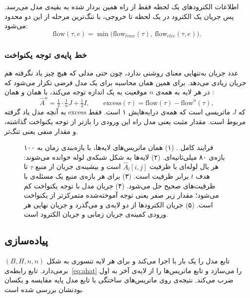 اطلاعات الکترودهای یک لحظه فقط از راه همین بردار ‌شده به بقیه‌ی مدل می‌رسد. پس جریان یک الکترود در یک لحظه تا خروجی، با تنگ‌ترین مرحله از این دو محدود می‌شود:
\begin{equation}
\mathrm{flow}(\tau,e)=\min\big(\mathrm{flow}_{time}(\tau),\ \mathrm{flow}_{elec}(\tau,e)\big).
\end{equation}

\subsubsection*{خط پایه‌ی توجه یکنواخت}
عدد جریان به‌تنهایی معنای روشنی ندارد، چون حتی مدلی که هیچ چیز یاد نگرفته هم جریان زیادی می‌دهد. برای همین همان محاسبه برای یک مدل فرضی تکرار می‌شود که در هر لایه به همه‌ی $n$ موقعیت به یک اندازه توجه می‌کند، با همان  و همان :
\begin{equation}
\hat A^{u}=\tfrac12\cdot\tfrac1n J+\tfrac12 I,\qquad \mathrm{excess}(\tau)=\mathrm{flow}(\tau)-\mathrm{flow}^{u}(\tau),
\end{equation}
که $J$ ماتریسی است که همه‌ی درایه‌هایش ۱ است. فقط $\mathrm{excess}$ به آنچه مدل یاد گرفته مربوط است. مقدار مثبت یعنی مدل راه این ورودی را بازتر از توجه یکنواخت گذاشته، و مقدار منفی یعنی تنگ‌تر.

\begin{figure}[p]
\centering

\caption{فرایند کامل . (۱) همان ماتریس‌های لایه‌ها، با بازه‌بندی زمان به ۱۰۰ بازه‌ی ۸۰ میلی‌ثانیه‌ای. (۲) لایه‌ها به شکل شبکه‌ی لوله خوانده می‌شوند: هر یال لوله‌ای با ظرفیت $\hat A_l[i,j]$ است و بیشینه‌ی جریان از منبع $\tau$ تا هدف $t$ برابر ظرفیت  است. (۳) برای هر بازه‌ی منبع یک مسئله‌ی  با ظرفیت‌های صحیح حل می‌شود. (۴) جریان مدل با توجه یکنواخت کم می‌شود؛ مقدار زیر صفر یعنی توجه آموخته‌شده متمرکزتر از یکنواخت است. (۵) جریان الکترودها از دو لایه‌ی  و  می‌گذرد و جریان نهایی هر ورودی کمینه‌ی جریان زمانی و جریان الکترود است.}
\label{fig:flow-process}
\end{figure}

\subsection{پیاده‌سازی}

تابع  مدل را یک بار با  اجرا می‌کند و برای هر لایه تنسوری به شکل $(B,H,n,n)$ برمی‌دارد. تابع  رابطه‌ی~\eqref{eq:ahat} را می‌سازد و تابع  ماتریس‌ها را از لایه‌ی آخر به اول ضرب می‌کند. نتیجه‌ی  روی ماتریس‌های ساختگی با تابع  مدل پایه مقایسه و یکسان بودنشان بررسی شده است.

